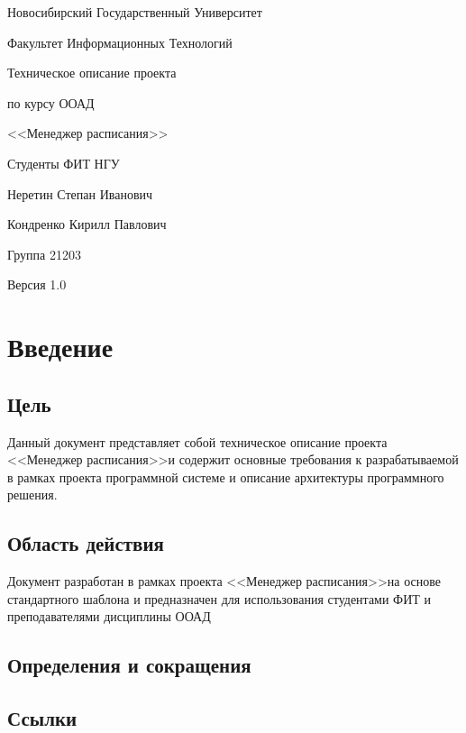 \documentclass[a4paper]{report}
\newcommand{\ProjectName}{<<Менеджер расписания>>}
\newcommand{\ProjectVersion}{1.0}
\begin{document}
	\pagestyle{empty}
	\begin{center}
		{\large Новосибирский Государственный Университет
		
		Факультет Информационных Технологий}
	\end{center}

	\begin{flushright}
		\bfseries{\huge Техническое описание проекта
		
		по курсу ООАД

		\bigskip

		\ProjectName
		
		\bigskip
		
		Студенты ФИТ НГУ
		
		Неретин Степан Иванович
		
		Кондренко Кирилл Павлович
		
		Группа 21203}
		
		\bigskip
		
		{\large Версия \ProjectVersion}
	\end{flushright}

	{\hypersetup{hidelinks}\tableofcontents\pagestyle{fancy}}

	\pagestyle{fancy}

	\chapter{Введение}
		\section{Цель}
			Данный документ представляет собой техническое описание проекта \ProjectName и содержит основные требования к разрабатываемой в рамках проекта программной системе и описание архитектуры программного решения.
		\section{Область действия}
			Документ разработан в рамках проекта \ProjectName на основе стандартного шаблона и предназначен для использования студентами ФИТ и преподавателями дисциплины ООАД
		\section{Определения и сокращения}
	
		\section{Ссылки}
		
\end{document}
